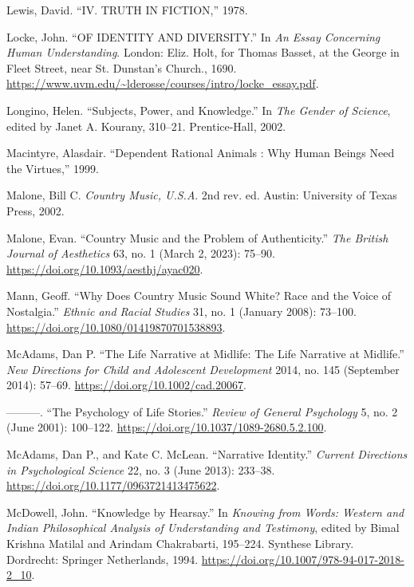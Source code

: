 \documentclass[phdthesis,12pt,final]{wuthesis}
\newlength{\cslhangindent}
\newenvironment{CSLReferences}[2] %
{\begin{list}{}{%
	\setlength{\itemindent}{0pt}
	\setlength{\leftmargin}{0pt}
	\setlength{\parsep}{0pt}
	\ifodd #1
	\setlength{\leftmargin}{\cslhangindent}
	\setlength{\itemindent}{-1\cslhangindent}
	\fi
	\setlength{\itemsep}{#2\baselineskip}}}
{\end{list}}
\theoremstyle{definition}
\theoremstyle{definition}
\theoremstyle{definition}
\theoremstyle{definition}
\theoremstyle{remark}
\begin{document}
\begin{CSLReferences}{1}{0}
Lewis, David. {``{IV}. {TRUTH IN FICTION},''} 1978.

Locke, John. {``{OF IDENTITY AND DIVERSITY}.''} In \emph{An {Essay Concerning Human Understanding}}. London: Eliz. Holt, for Thomas Basset, at the George in Fleet Street, near St. Dunstan's Church., 1690. \url{https://www.uvm.edu/~lderosse/courses/intro/locke_essay.pdf}.

Longino, Helen. {``Subjects, {Power}, and {Knowledge}.''} In \emph{The {Gender} of {Science}}, edited by Janet A. Kourany, 310--21. Prentice-Hall, 2002.

Macintyre, Alasdair. {``Dependent Rational Animals : Why Human Beings Need the Virtues,''} 1999.

Malone, Bill C. \emph{Country Music, {U}.{S}.{A}}. 2nd rev. ed. Austin: University of Texas Press, 2002.

Malone, Evan. {``Country {Music} and the {Problem} of {Authenticity}.''} \emph{The British Journal of Aesthetics} 63, no. 1 (March 2, 2023): 75--90. \url{https://doi.org/10.1093/aesthj/ayac020}.

Mann, Geoff. {``Why Does Country Music Sound White? {Race} and the Voice of Nostalgia.''} \emph{Ethnic and Racial Studies} 31, no. 1 (January 2008): 73--100. \url{https://doi.org/10.1080/01419870701538893}.

McAdams, Dan P. {``The {Life Narrative} at {Midlife}: {The Life Narrative} at {Midlife}.''} \emph{New Directions for Child and Adolescent Development} 2014, no. 145 (September 2014): 57--69. \url{https://doi.org/10.1002/cad.20067}.

---------. {``The {Psychology} of {Life Stories}.''} \emph{Review of General Psychology} 5, no. 2 (June 2001): 100--122. \url{https://doi.org/10.1037/1089-2680.5.2.100}.

McAdams, Dan P., and Kate C. McLean. {``Narrative {Identity}.''} \emph{Current Directions in Psychological Science} 22, no. 3 (June 2013): 233--38. \url{https://doi.org/10.1177/0963721413475622}.

McDowell, John. {``Knowledge by {Hearsay}.''} In \emph{Knowing from {Words}: {Western} and {Indian Philosophical Analysis} of {Understanding} and {Testimony}}, edited by Bimal Krishna Matilal and Arindam Chakrabarti, 195--224. Synthese {Library}. Dordrecht: Springer Netherlands, 1994. \url{https://doi.org/10.1007/978-94-017-2018-2_10}.


\end{CSLReferences}
\end{document}
